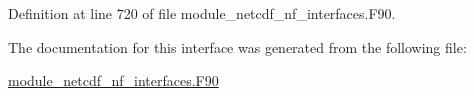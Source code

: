 Definition at line 720 of file module\+\_\+netcdf\+\_\+nf\+\_\+interfaces.\+F90.



The documentation for this interface was generated from the following file\+:\begin{DoxyCompactItemize}
\item 
\hyperlink{module__netcdf__nf__interfaces_8F90}{module\+\_\+netcdf\+\_\+nf\+\_\+interfaces.\+F90}\end{DoxyCompactItemize}
